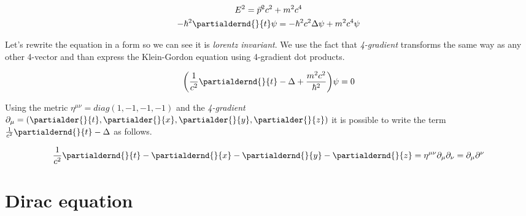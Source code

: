 \begin{equation*}
    \begin{gathered}
        E^{2} = \vec{p}^{2} c^{2} + m^{2} c^{4} \\
        - \hbar^{2} \partialdernd{}{t} \psi = - \hbar^{2} c^{2} \Delta \psi + m^{2} c^{4} \psi
    \end{gathered}
\end{equation*}

Let's rewrite the equation in a form so we can see it is \textit{lorentz invariant}. We use the fact that \textit{4-gradient}
transforms the same way as any other 4-vector and than express the Klein-Gordon equation using 4-gradient dot products.

\begin{equation}
    \bigg(\frac{1}{c^{2}} \partialdernd{}{t} - \Delta + \frac{m^{2} c^{2}}{\hbar^{2}}\bigg) \psi = 0
\end{equation}

Using the metric $\eta^{\mu \nu} = diag(1, -1, -1, -1)$ and the \textit{4-gradient} $\partial_{\mu} = (\partialder{}{t}, \partialder{}{x}, \partialder{}{y}, \partialder{}{z})$ 
it is possible to write the term $\frac{1}{c^{2}} \partialdernd{}{t} - \Delta$ as follows.

\begin{equation*}
     \frac{1}{c^{2}} \partialdernd{}{t} - \partialdernd{}{x} - \partialdernd{}{y} - \partialdernd{}{z} = \eta^{\mu \nu} \partial_{\mu} \partial_{\nu} = \partial_{\mu} \partial^{\nu}
\end{equation*}

\section{Dirac equation}
